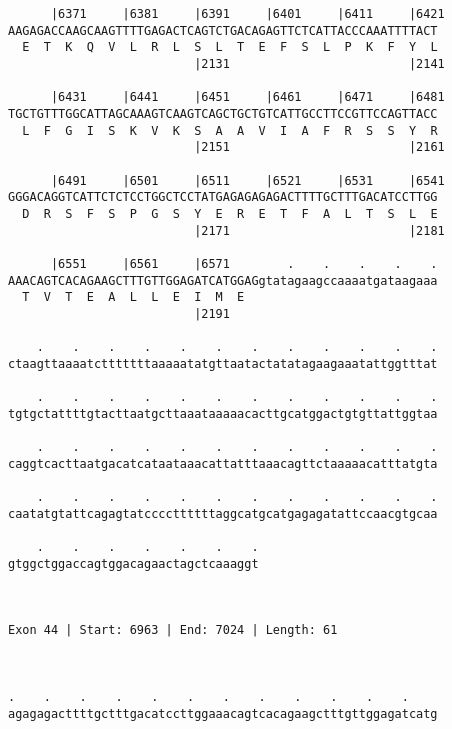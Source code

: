 \documentclass{article}
\begin{document}
\begin{Verbatim}
      |6371     |6381     |6391     |6401     |6411     |6421
AAGAGACCAAGCAAGTTTTGAGACTCAGTCTGACAGAGTTCTCATTACCCAAATTTTACT
  E  T  K  Q  V  L  R  L  S  L  T  E  F  S  L  P  K  F  Y  L
                          |2131                         |2141
  
      |6431     |6441     |6451     |6461     |6471     |6481
TGCTGTTTGGCATTAGCAAAGTCAAGTCAGCTGCTGTCATTGCCTTCCGTTCCAGTTACC
  L  F  G  I  S  K  V  K  S  A  A  V  I  A  F  R  S  S  Y  R
                          |2151                         |2161
  
      |6491     |6501     |6511     |6521     |6531     |6541
GGGACAGGTCATTCTCTCCTGGCTCCTATGAGAGAGAGACTTTTGCTTTGACATCCTTGG
  D  R  S  F  S  P  G  S  Y  E  R  E  T  F  A  L  T  S  L  E
                          |2171                         |2181
  
      |6551     |6561     |6571        .    .    .    .    .
AAACAGTCACAGAAGCTTTGTTGGAGATCATGGAGgtatagaagccaaaatgataagaaa
  T  V  T  E  A  L  L  E  I  M  E                           
                          |2191                             
  
    .    .    .    .    .    .    .    .    .    .    .    .
ctaagttaaaatctttttttaaaaatatgttaatactatatagaagaaatattggtttat
                                                            
    .    .    .    .    .    .    .    .    .    .    .    .
tgtgctattttgtacttaatgcttaaataaaaacacttgcatggactgtgttattggtaa
                                                            
    .    .    .    .    .    .    .    .    .    .    .    .
caggtcacttaatgacatcataataaacattatttaaacagttctaaaaacatttatgta
                                                            
    .    .    .    .    .    .    .    .    .    .    .    .
caatatgtattcagagtatccccttttttaggcatgcatgagagatattccaacgtgcaa
                                                            
    .    .    .    .    .    .    .
gtggctggaccagtggacagaactagctcaaaggt
                                   
                                   
 
Exon 44 | Start: 6963 | End: 7024 | Length: 61



.    .    .    .    .    .    .    .    .    .    .    .    
agagagacttttgctttgacatccttggaaacagtcacagaagctttgttggagatcatg
                                                            

\end{Verbatim}
\end{document}
